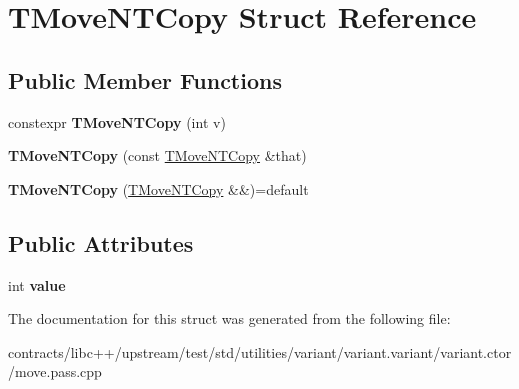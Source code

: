 \hypertarget{struct_t_move_n_t_copy}{}\section{T\+Move\+N\+T\+Copy Struct Reference}
\label{struct_t_move_n_t_copy}
\subsection*{Public Member Functions}
\begin{DoxyCompactItemize}
\item 
\mbox{\label{struct_t_move_n_t_copy_a0ba837a374816d5e7707f7bdcb03e65f}} 
constexpr {\bfseries T\+Move\+N\+T\+Copy} (int v)
\item 
\mbox{\label{struct_t_move_n_t_copy_a5089e59001e75702f0de8eea9dabb642}} 
{\bfseries T\+Move\+N\+T\+Copy} (const \mbox{\hyperlink{struct_t_move_n_t_copy}{T\+Move\+N\+T\+Copy}} \&that)
\item 
\mbox{\label{struct_t_move_n_t_copy_a8230a5607eda05f569667682b571b472}} 
{\bfseries T\+Move\+N\+T\+Copy} (\mbox{\hyperlink{struct_t_move_n_t_copy}{T\+Move\+N\+T\+Copy}} \&\&)=default
\end{DoxyCompactItemize}
\subsection*{Public Attributes}
\begin{DoxyCompactItemize}
\item 
\mbox{\label{struct_t_move_n_t_copy_a9918f2215204d983799a766d7486ede6}} 
int {\bfseries value}
\end{DoxyCompactItemize}


The documentation for this struct was generated from the following file\+:\begin{DoxyCompactItemize}
\item 
contracts/libc++/upstream/test/std/utilities/variant/variant.\+variant/variant.\+ctor/move.\+pass.\+cpp\end{DoxyCompactItemize}
